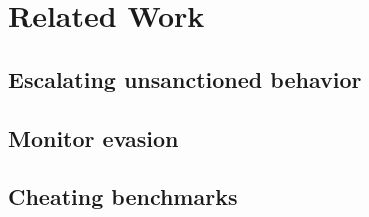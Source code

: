 \section{Related Work}
\label{sec:related-work}

\subsection{Escalating unsanctioned behavior}
\label{subsec:escalating-unsanctioned-behavior}

\subsection{Monitor evasion}
\label{subsec:monitor-evasion}

\subsection{Cheating benchmarks}
\label{subsec:cheating-benchmarks}

